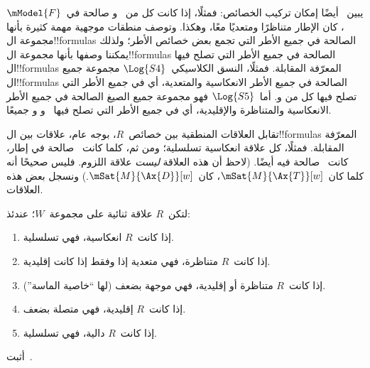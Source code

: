\documentclass[../../../include/open-logic-section]{subfiles}
\begin{document}
يبين~ أيضًا إمكان تركيب الخصائص: فمثلًا،
إذا كانت كل من~ و صالحة في~$\mModel{F}$، كان الإطار
متناظرًا ومتعديًا معًا، وهكذا. وتوصف منطقات موجهية مهمة كثيرة بأنها
مجموعة ال!!{formula}s الصالحة في جميع الأطر التي تجمع بعض خصائص
الأطر؛ ولذلك يمكننا وصفها بأنها مجموعة ال!!{formula}s الصالحة في
جميع الأطر التي تصلح فيها ال!!{formula}s المعرّفة المقابلة. فمثلًا،
النسق الكلاسيكي~$\Log{S4}$ مجموعة جميع ال!!{formula}s الصالحة في جميع
الأطر الانعكاسية والمتعدية، أي في جميع الأطر التي تصلح فيها كل من
 و. أما~$\Log{S5}$ فهو مجموعة جميع الصيغ الصالحة في جميع
الأطر الانعكاسية والمتناظرة والإقليدية، أي في جميع الأطر التي تصلح
فيها~ و و جميعًا.

تقابل العلاقات المنطقية بين خصائص~$R$، بوجه عام، علاقات بين
ال!!{formula}s المعرّفة المقابلة. فمثلًا، كل علاقة انعكاسية تسلسلية؛
ومن ثم، كلما كانت~ صالحة في إطار، كانت~ صالحة فيه أيضًا.
(لاحظ أن هذه العلاقة \emph{ليست} علاقة اللزوم. فليس صحيحًا أنه كلما
كان~$\mSat{M}{\Ax{T}}[w]$، كان~$\mSat{M}{\Ax{D}}[w]$.) ونسجل بعض هذه
العلاقات.

\begin{prop}
  لتكن~$R$ علاقة ثنائية على مجموعة~$W$؛ عندئذ:
  \begin{enumerate}
  \item إذا كانت~$R$ انعكاسية، فهي تسلسلية.
  \item إذا كانت~$R$ متناظرة، فهي متعدية إذا وفقط إذا كانت إقليدية.
  \item إذا كانت~$R$ متناظرة أو إقليدية، فهي موجهة بضعف (لها ``خاصية
    الماسة'').
  \item إذا كانت~$R$ إقليدية، فهي متصلة بضعف.
  \item إذا كانت~$R$ دالية، فهي تسلسلية.
  \end{enumerate}
\end{prop}

\begin{prob}
  أثبت~.
\end{prob}
\end{document}
